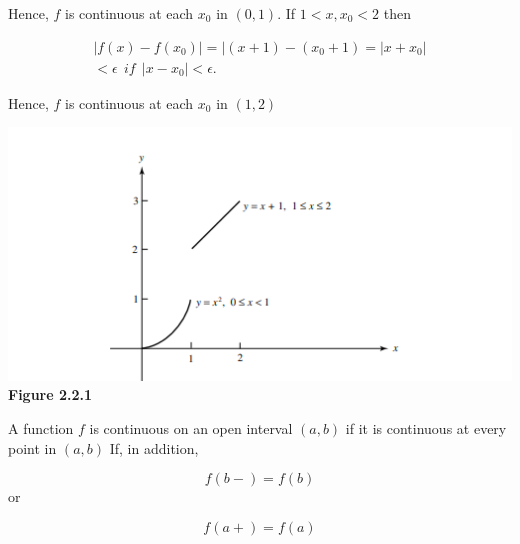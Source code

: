 \begin{flushleft}
Hence, $f$ is continuous at each $x_0$ in $(0, 1)$. If $1 < x, x_0 < 2$ then

\begin{align*}
|f(x) - f(x_0)| = |(x+1)-(x_0+1) = | x+x_0|  \\
< \epsilon \ \   if \ \   |x -x_0| < \epsilon .
\end{align*}

 
Hence, $f$ is continuous at each $x_0$ in $(1,2)$





\includegraphics{labs/Figure.PNG}\\
\centering \textbf{Figure 2.2.1} 

\begin{definition}\label{d221}

 A function $f$ is continuous on an open interval $(a, b)$ if it is continuous at every point in $(a, b)$ If, in addition, 

\begin{equation}\label{formula2}
f(b-) = f(b)
\end{equation}
or

\begin{equation}\label{formula3}
f(a+) = f(a)
\end{equation}
\end{definition}

\end{flushleft}



